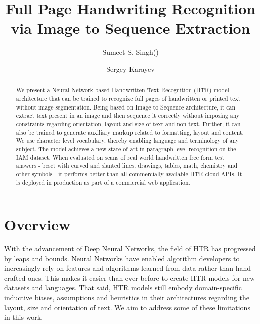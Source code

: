 \documentclass[runningheads]{llncs}
\begin{document}
\title{Full Page Handwriting Recognition via Image to Sequence Extraction}
\author{Sumeet S. Singh(\Letter) \and
Sergey Karayev
}

\maketitle              \begin{abstract}
We present a Neural Network based Handwritten Text Recognition (HTR) model architecture that can be trained to recognize full pages of handwritten or printed text without image segmentation. Being based on Image to Sequence architecture, it can extract text present in an image and then sequence it correctly without imposing any constraints regarding orientation, layout and size of text and non-text. Further, it can also be trained to generate auxiliary markup related to formatting, layout and content. We use character level vocabulary, thereby enabling language and terminology of any subject. The model achieves a new state-of-art in paragraph level recognition on the IAM dataset. When evaluated on scans of real world handwritten free form test answers - beset with curved and slanted lines, drawings, tables, math, chemistry and other symbols - it performs better than all commercially available HTR cloud APIs. It is deployed in production as part of a commercial web application.

\end{abstract}

\section{Overview}
With the advancement of Deep Neural Networks, the field of {\small HTR} has progressed by leaps and bounds.
Neural Networks have enabled algorithm developers to increasingly rely on features and algorithms learned from data rather than hand crafted ones.
This makes it easier than ever before to create {\small HTR} models for new datasets and languages.
That said, {\small HTR} models still embody domain-specific inductive biases, assumptions and heuristics in their architectures regarding the layout, size and orientation of text.
We aim to address some of these limitations in this work.
\end{document}
